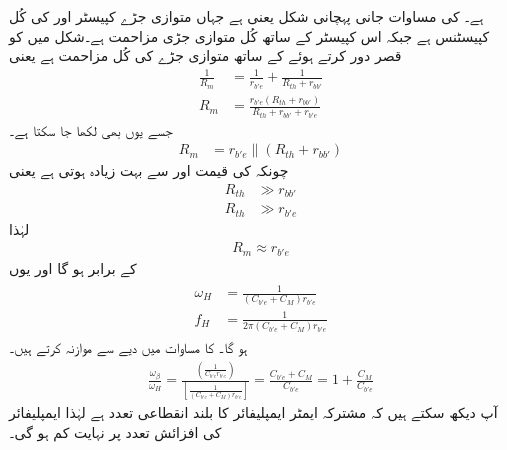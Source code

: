 ہے۔ کی مساوات جانی پہچانی شکل یعنی  ہے جہاں  متوازی جڑے کپیسٹر  اور  کی کُل کپیسٹنس  ہے جبکہ  اس کپیسٹر کے ساتھ کُل متوازی جڑی مزاحمت ہے۔شکل  میں  کو قصر دور کرتے ہوئے  کے ساتھ متوازی جڑے   کی کُل مزاحمت  ہے یعنی
\begin{align*}
\frac{1}{R_m}&=\frac{1}{r_{b'e}}+\frac{1}{R_{th}+r_{bb'}} \\
R_m&=\frac{ r_{b'e} \left(R_{th}+r_{bb'} \right)}{R_{th}+r_{bb'}+r_{b'e}}
\end{align*}
جسے یوں بھی لکھا جا سکتا ہے۔
\begin{align*}
R_m&= r_{b'e} \mathbin{\|}\left(R_{th}+r_{bb'} \right)
\end{align*}
چونکہ   کی قیمت  اور  سے بہت زیادہ ہوتی ہے یعنی
\begin{align*}
R_{th} & \gg r_{bb'}\\
R_{th} & \gg r_{b'e}
\end{align*}
لہٰذا
\begin{align*}
R_m \approx r_{b'e}
\end{align*}
کے برابر ہو گا اور یوں
\begin{gather}
\begin{aligned} \label{مساوات_تعددی_ردعمل_بلند_انقطاعی_تعدد}
\omega_H &= \frac{1}{\left(C_{b'e}+C_M \right) r_{b'e}} \\
f_H& = \frac{1}{2 \pi \left(C_{b'e}+C_M \right) r_{b'e}} 
\end{aligned}
\end{gather}
ہو گا۔ کا مساوات  میں دیے  سے موازنہ کرتے ہیں۔
\begin{align} \label{مساوات_تعددی_ردعمل_بلند_تعدد_شرح}
\frac{\omega_{\beta}}{\omega_H}=\frac{\left(\frac{1}{C_{b'e} r_{b'e}} \right)}{\left [\frac{1}{\left(C_{b'e}+C_M \right) r_{b'e}} \right]}=\frac{C_{b'e}+C_M}{C_{b'e}}=1+\frac{C_M}{C_{b'e}}
\end{align}
آپ دیکھ سکتے ہیں کہ مشترکہ ایمٹر       ایمپلیفائر کا بلند انقطاعی تعدد   ہے  لہٰذا ایمپلیفائر کی افزائش   تعدد پر نہایت کم ہو گی۔

